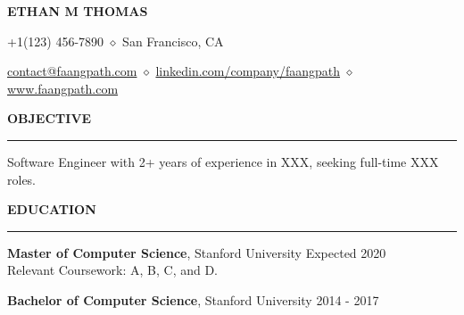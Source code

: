 \documentclass[11pt,letterpaper]{article}
\begin{document}
\begingroup
    \centerline{\MakeUppercase{\LARGE\bf Ethan M Thomas}}
    \medskip
\endgroup

\begingroup
\centerline{+1(123) 456-7890 $ \diamond $ San Francisco, CA}
\endgroup
\par

\begingroup
\centerline{\href{mailto:contact@faangpath.com}{contact@faangpath.com} $ \diamond $ \href{https://linkedin.com/company/faangpath}{linkedin.com/company/faangpath} $ \diamond $ \href{www.faangpath.com}{www.faangpath.com}}
\endgroup
\par


\medskip
\MakeUppercase{{\bf Objective}} %
\medskip
\hrule %
\begin{list}{}{\setlength{\leftmargin}{0em}}
\item 
    {Software Engineer with 2+ years of experience in XXX, seeking full-time XXX roles.}
\end{list}


\medskip
\MakeUppercase{{\bf Education}} %
\medskip
\hrule %
\begin{list}{}{\setlength{\leftmargin}{0em}}
\item 
{\bf Master of Computer Science}, Stanford University \hfill {Expected 2020}\\
Relevant Coursework: A, B, C, and D.
\item 
{\bf Bachelor of Computer Science}, Stanford University \hfill {2014 - 2017}
\end{list}


\end{document}
